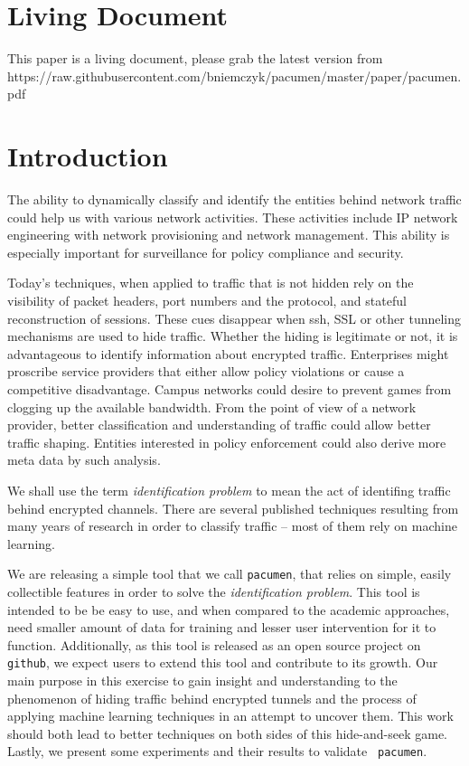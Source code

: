\section{Living Document}

This paper is a living document, please grab the latest version from \\
https://raw.githubusercontent.com/bniemczyk/pacumen/master/paper/pacumen.pdf

\section{Introduction}

The ability to dynamically classify and identify the entities behind
network traffic could help us with various network activities.  These
activities include IP network engineering with network provisioning
and network management. This ability is especially important for
surveillance for policy compliance and security.

Today's techniques, when applied to traffic that is not hidden rely on
the visibility of packet headers, port numbers and the protocol, and
stateful reconstruction of sessions.  These cues disappear when ssh,
SSL or other tunneling mechanisms are used to hide traffic. Whether
the hiding is legitimate or not, it is advantageous to identify
information about encrypted traffic. Enterprises might proscribe
service providers that either allow policy violations or cause a
competitive disadvantage.  Campus networks could desire to prevent
games from clogging up the available bandwidth.  From the point of
view of a network provider, better classification and understanding of
traffic could allow better traffic shaping. Entities interested in
policy enforcement could also derive more meta data by such analysis.

We shall use the term \emph{identification problem} to mean the act of
identifing traffic behind encrypted channels.  There are several
published techniques resulting from many years of research in order to
classify traffic -- most of them rely on machine learning.


We are releasing a simple tool that we call {\tt pacumen}, that relies
on simple, easily collectible features in order to solve the
\emph{identification problem}. This tool is intended to be be easy to
use, and when compared to the academic approaches, need smaller amount
of data for training and lesser user intervention for it to
function. Additionally, as this tool is released as an open source
project on {\tt github}, we expect users to extend this tool and
contribute to its growth.  Our main purpose in this exercise to gain
insight and understanding to the phenomenon of hiding traffic behind
encrypted tunnels and the process of applying machine learning
techniques in an attempt to uncover them.  This work should both lead
to better techniques on both sides of this hide-and-seek game. Lastly,
we present some experiments and their results to validate {\tt
  pacumen}.
